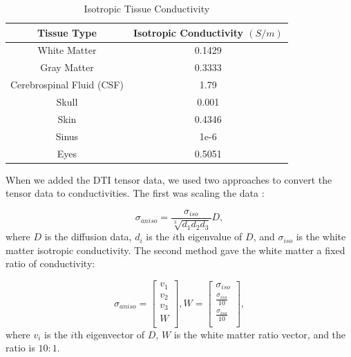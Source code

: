 \begin{table}[H]
\centering
\caption{Isotropic Tissue Conductivity}
\label{tab:cond}
\begin{tabular}{|c|c|}
\hline
Tissue Type               & Isotropic Conductivity $(S/m)$ \\ \hline
\hline
White Matter              & 0.1429                         \\ \hline
Gray Matter               & 0.3333                         \\ \hline
Cerebrospinal Fluid (CSF) & 1.79                           \\ \hline
Skull                     & 0.001                          \\ \hline
Skin                      & 0.4346                         \\ \hline
Sinus                     & 1e-6                           \\ \hline
Eyes                      & 0.5051                         \\ \hline
\end{tabular}
\end{table}

When we added the DTI tensor data, we used two approaches to convert the tensor data to conductivities. The first was scaling the data \cite{ref:scaling}: 

\begin{equation}
\label{eq:scaling}
\sigma_{aniso} = \frac{\sigma_{iso}}{\sqrt[3]{d_1d_2d_3}}D,
\end{equation}
where $D$ is the diffusion data, $d_i$ is the $i$th eigenvalue of $D$, and $\sigma_{iso}$ is the white matter isotropic conductivity. The second method gave the white matter a fixed ratio of conductivity:

\begin{equation}
\label{eq:fixed}
\sigma_{aniso} = \begin{bmatrix}
v_1\\
v_2\\
v_3\\
W\\
\end{bmatrix}, 
W = \begin{bmatrix}
\sigma_{iso}\\
\frac{\sigma_{iso}}{10}\\
\frac{\sigma_{iso}}{10}\\
\end{bmatrix},
\end{equation}
where $v_i$ is the $i$th eigenvector of $D$, $W$ is the white matter ratio vector, and the ratio is $10:1$.

